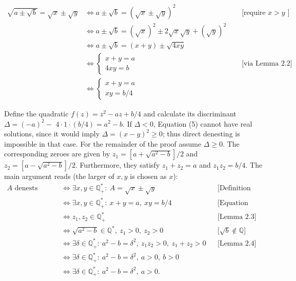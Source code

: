 \documentclass[11pt,letterpaper]{article}
\begin{document}
\[
\begin{array}{rlr}
\sqrt{a \pm \sqrt{b}}=\sqrt{x} \pm \sqrt{y} & \Longleftrightarrow a \pm \sqrt{b}=(\sqrt{x} \pm \sqrt{y})^{2} & \quad \text { [require } x>y \text { ] } \\
& \Longleftrightarrow a \pm \sqrt{b}=(\sqrt{x})^{2} \pm 2 \sqrt{x} \sqrt{y}+(\sqrt{y})^{2} & \\
& \Longleftrightarrow a \pm \sqrt{b}=(x+y) \pm \sqrt{4 x y} & \\
& \Longleftrightarrow\left\{\begin{array}{l}
x+y=a \\
4 x y=b
\end{array}\right. & \quad \text { [via Lemma 2.2] } \\
& \Longleftrightarrow\left\{\begin{array}{l}
x+y=a \\
x y=b / 4
\end{array}\right. \tag{5}\label{eq:5}
\end{array}
\]

Define the quadratic $f(z)=z^{2}-a z+b / 4$ and calculate its discriminant $\Delta=(-a)^{2}-$ $4 \cdot 1 \cdot(b / 4)=a^{2}-b$. If $\Delta<0$, Equation (5) cannot have real solutions, since it would imply $\Delta=(x-y)^2\geq0$; thus direct denesting is impossible in that case. For the remainder of the proof assume $\Delta\geq0$. The corresponding zeroes are given by $z_{1}=\left[a+\sqrt{a^{2}-b}\right] / 2$ and $z_{2}=\left[a-\sqrt{a^{2}-b}\right] / 2$. Furthermore, they satisfy $z_{1}+z_{2}=a$ and $z_{1} z_{2}=b / 4$. The main argument reads (the larger of $x,y$ is chosen as $x$):
\[
\begin{aligned}
 A\text{ denests directly}
 &\Longleftrightarrow\exists x,y\in\mathbb Q_+^*:\ A=\sqrt x\pm\sqrt y
       &&\text{[Definition 2.1]}\\
 &\Longleftrightarrow\exists x,y\in\mathbb Q_+^*:\ x+y=a,\ xy=b/4
       &&\text{[Equation (5)]}\\
 &\Longleftrightarrow z_1,z_2\in\mathbb Q_+^*
       &&\text{[Lemma 2.3]}\\
 &\Longleftrightarrow\sqrt{a^2-b}\in\mathbb Q^*,\ z_1>0,\ z_2>0
       &&\text{[$\sqrt b\notin\mathbb Q$]}\\
 &\Longleftrightarrow\exists\delta\in\mathbb Q_+^*:\ a^2-b=\delta^2,\
            z_1z_2>0,\ z_1+z_2>0
       &&\text{[Lemma 2.4]}\\
 &\Longleftrightarrow\exists\delta\in\mathbb Q_+^*:\ a^2-b=\delta^2,\ a>0,\ b>0\\
 &\Longleftrightarrow\exists\delta\in\mathbb Q_+^*:\ a^2-b=\delta^2,\ a>0.
\end{aligned}
\]
\end{document}
